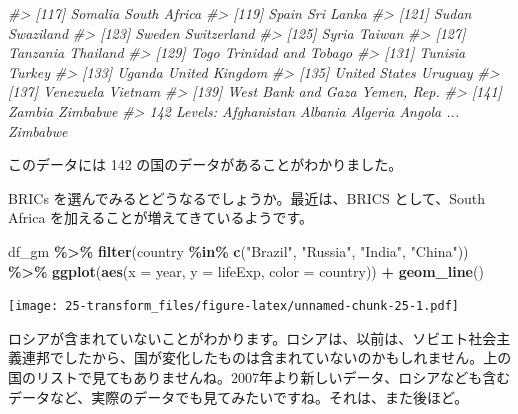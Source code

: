 \documentclass[
  xelatex, ja=standard]{bxjsbook}
\newenvironment{Shaded}{\begin{snugshade}}{\end{snugshade}}
\newcommand{\AttributeTok}[1]{\textcolor[rgb]{0.13,0.29,0.53}{#1}}
\newcommand{\CommentTok}[1]{\textcolor[rgb]{0.56,0.35,0.01}{\textit{#1}}}
\newcommand{\FunctionTok}[1]{\textcolor[rgb]{0.13,0.29,0.53}{\textbf{#1}}}
\newcommand{\NormalTok}[1]{#1}
\newcommand{\SpecialCharTok}[1]{\textcolor[rgb]{0.81,0.36,0.00}{\textbf{#1}}}
\newcommand{\StringTok}[1]{\textcolor[rgb]{0.31,0.60,0.02}{#1}}
\theoremstyle{definition}
\theoremstyle{definition}
\theoremstyle{definition}
\theoremstyle{definition}
\theoremstyle{remark}
\begin{document}
\begin{Shaded}
\begin{Highlighting}[]
\CommentTok{\#\textgreater{} [117] Somalia                  South Africa            }
\CommentTok{\#\textgreater{} [119] Spain                    Sri Lanka               }
\CommentTok{\#\textgreater{} [121] Sudan                    Swaziland               }
\CommentTok{\#\textgreater{} [123] Sweden                   Switzerland             }
\CommentTok{\#\textgreater{} [125] Syria                    Taiwan                  }
\CommentTok{\#\textgreater{} [127] Tanzania                 Thailand                }
\CommentTok{\#\textgreater{} [129] Togo                     Trinidad and Tobago     }
\CommentTok{\#\textgreater{} [131] Tunisia                  Turkey                  }
\CommentTok{\#\textgreater{} [133] Uganda                   United Kingdom          }
\CommentTok{\#\textgreater{} [135] United States            Uruguay                 }
\CommentTok{\#\textgreater{} [137] Venezuela                Vietnam                 }
\CommentTok{\#\textgreater{} [139] West Bank and Gaza       Yemen, Rep.             }
\CommentTok{\#\textgreater{} [141] Zambia                   Zimbabwe                }
\CommentTok{\#\textgreater{} 142 Levels: Afghanistan Albania Algeria Angola ... Zimbabwe}
\end{Highlighting}
\end{Shaded}

このデータには 142 の国のデータがあることがわかりました。

BRICs を選んでみるとどうなるでしょうか。最近は、BRICS として、South Africa を加えることが増えてきているようです。

\begin{Shaded}
\begin{Highlighting}[]
\NormalTok{df\_gm }\SpecialCharTok{\%\textgreater{}\%} \FunctionTok{filter}\NormalTok{(country }\SpecialCharTok{\%in\%} \FunctionTok{c}\NormalTok{(}\StringTok{"Brazil"}\NormalTok{, }\StringTok{"Russia"}\NormalTok{, }\StringTok{"India"}\NormalTok{, }\StringTok{"China"}\NormalTok{)) }\SpecialCharTok{\%\textgreater{}\%}
  \FunctionTok{ggplot}\NormalTok{(}\FunctionTok{aes}\NormalTok{(}\AttributeTok{x =}\NormalTok{ year, }\AttributeTok{y =}\NormalTok{ lifeExp, }\AttributeTok{color =}\NormalTok{ country)) }\SpecialCharTok{+} \FunctionTok{geom\_line}\NormalTok{()}
\end{Highlighting}
\end{Shaded}

\texttt{[image: 25-transform\_files/figure-latex/unnamed-chunk-25-1.pdf]}

ロシアが含まれていないことがわかります。ロシアは、以前は、ソビエト社会主義連邦でしたから、国が変化したものは含まれていないのかもしれません。上の国のリストで見てもありませんね。2007年より新しいデータ、ロシアなども含むデータなど、実際のデータでも見てみたいですね。それは、また後ほど。
\end{document}
